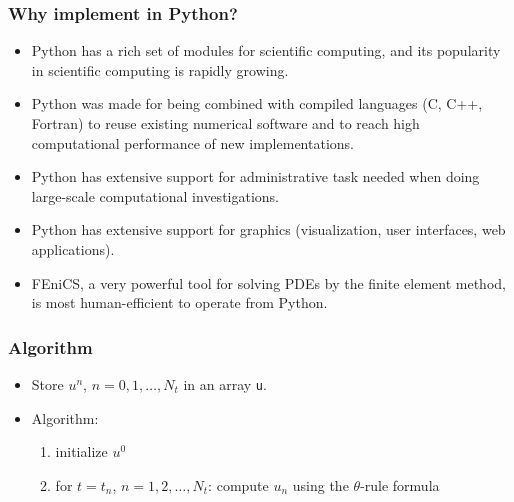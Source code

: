\documentclass{beamer}
\begin{document}
\begin{frame}
\frametitle{Why implement in Python?}

\begin{itemize}
  \item Python has a rich set of modules for scientific computing, and its
    popularity in scientific computing is rapidly growing.

  \item Python was made for being combined with compiled languages
    (C, C++, Fortran) to reuse existing numerical software and to
    reach high computational performance of new implementations.

  \item Python has extensive support for administrative task
    needed when doing large-scale computational investigations.

  \item Python has extensive support for graphics (visualization,
    user interfaces, web applications).

  \item FEniCS, a very powerful tool for solving PDEs by
    the finite element method, is most human-efficient to operate
    from Python.
\end{itemize}

\noindent
\end{frame}

\begin{frame}
\frametitle{Algorithm}

\label{decay:py1}

\begin{itemize}
 \item Store $u^n$, $n=0,1,\ldots,N_t$ in an array \texttt{u}.

 \item Algorithm:
\begin{enumerate}

  \item initialize $u^0$

  \item for $t=t_n$, $n=1,2,\ldots,N_t$: compute $u_n$ using
     the $\theta$-rule formula
\end{enumerate}

\noindent
\end{itemize}

\noindent
\end{frame}
\end{document}
